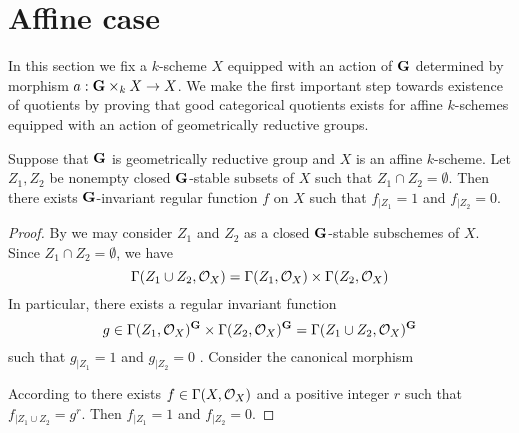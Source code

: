 \section{Affine case}
\noindent
In this section we fix a $k$-scheme $X$ equipped with an action of $\mathbf{G}$ determined by morphism $a:\mathbf{G}\times_kX\rightarrow X$. We make the first important step towards existence of quotients by proving that good categorical quotients exists for affine $k$-schemes equipped with an action of geometrically reductive groups. 

\begin{proposition}\label{proposition:invariant_functions_separate_closed_sets_for_geometrically_reductive}
Suppose that $\mathbf{G}$ is geometrically reductive group and $X$ is an affine $k$-scheme. Let $Z_1,Z_2$ be nonempty closed $\mathbf{G}$-stable subsets of $X$ such that $Z_1\cap Z_2 = \emptyset$. Then there exists $\mathbf{G}$-invariant regular function $f$ on $X$ such that $f_{\mid Z_1} = 1$ and $f_{\mid Z_2} = 0$.
\end{proposition}
\begin{proof}
By {\cite[Corollary 5.4]{Algebraic_groups}} we may consider $Z_1$ and $Z_2$ as a closed $\mathbf{G}$-stable subschemes of $X$. Since $Z_1\cap Z_2 = \emptyset$, we have 
$$\Gamma(Z_1\cup Z_2,{\mathcal O}_X) = \Gamma(Z_1,{\mathcal O}_X)\times \Gamma(Z_2,{\mathcal O}_X)$$
In particular, there exists a regular invariant function 
$$g \in \Gamma(Z_1,{\mathcal O}_X)^{\mathbf{G}}\times \Gamma(Z_2,{\mathcal O}_X)^{\mathbf{G}} = \Gamma(Z_1\cup Z_2,{\mathcal O}_X)^{\mathbf{G}}$$
such that $g_{\mid Z_1} = 1$ and $g_{\mid Z_2} = 0$
. Consider the canonical morphism
\begin{center}
\end{center}
According to {\cite[Theorem 2.4]{Geometrically_reductive_and_Nagata}} there exists $f\in \Gamma(X,{\mathcal O}_X)$ and a positive integer $r$ such that $f_{\mid Z_1\cup Z_2} = g^r$. Then $f_{\mid Z_1} = 1$ and $f_{\mid Z_2}=0$.
\end{proof}

